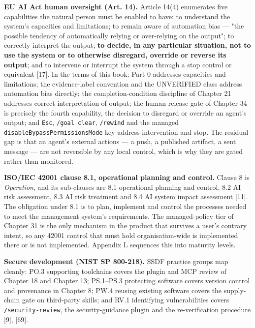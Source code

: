 \documentclass[11pt,a4paper,twoside,openany]{book}
\begin{document}
\textbf{EU AI Act human oversight (Art. 14).} Article 14(4) enumerates five capabilities the natural person must be enabled to have: to understand the system's capacities and limitations; to remain aware of automation bias — "the possible tendency of automatically relying or over-relying on the output"; to correctly interpret the output; \textbf{to decide, in any particular situation, not to use the system or to otherwise disregard, override or reverse its output}; and to intervene or interrupt the system through a stop control or equivalent [17]. In the terms of this book: Part 0 addresses capacities and limitations; the evidence-label convention and the UNVERIFIED class address automation bias directly; the completion-condition discipline of Chapter 21 addresses correct interpretation of output; the human release gate of Chapter 34 is precisely the fourth capability, the decision to disregard or override an agent's output; and \texttt{Esc}, \texttt{/\allowbreak{}goal clear}, \texttt{/\allowbreak{}rewind} and the managed \texttt{disable\allowbreak{}Bypass\allowbreak{}Permissions\allowbreak{}Mode} key address intervention and stop. The residual gap is that an agent's external actions — a push, a published artifact, a sent message — are not reversible by any local control, which is why they are gated rather than monitored.


\textbf{ISO/IEC 42001 clause 8.1, operational planning and control.} Clause 8 is \emph{Operation}, and its sub-clauses are 8.1 operational planning and control, 8.2 AI risk assessment, 8.3 AI risk treatment and 8.4 AI system impact assessment [11]. The obligation under 8.1 is to plan, implement and control the processes needed to meet the management system's requirements. The managed-policy tier of Chapter 31 is the only mechanism in the product that survives a user's contrary intent, so any 42001 control that must hold organisation-wide is implemented there or is not implemented. Appendix L sequences this into maturity levels.


\textbf{Secure development (NIST SP 800-218).} SSDF practice groups map cleanly: PO.3 supporting toolchains covers the plugin and MCP review of Chapter 18 and Chapter 13; PS.1–PS.3 protecting software covers version control and provenance in Chapter 8; PW.4 reusing existing software covers the supply-chain gate on third-party skills; and RV.1 identifying vulnerabilities covers \texttt{/\allowbreak{}security-\allowbreak{}review}, the security-guidance plugin and the re-verification procedure [9], [69].
\end{document}
